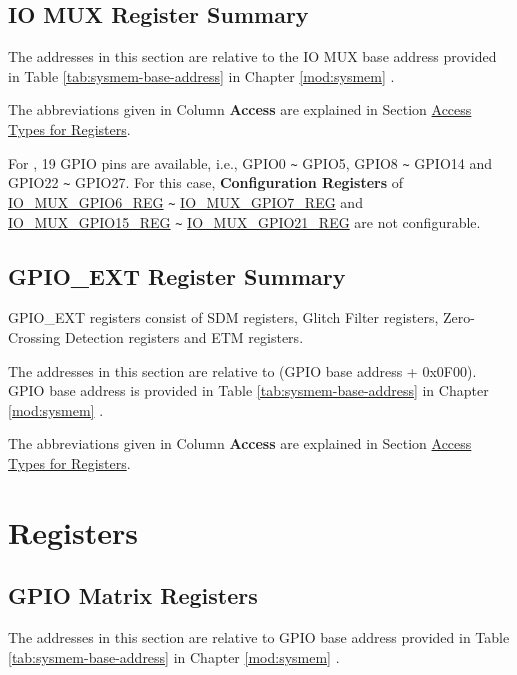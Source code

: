 \documentclass[main\_\_EN.tex]{subfiles}
\begin{document}
\label{section:4.12}



\subsection{IO MUX Register Summary}

The addresses in this section are relative to the IO MUX base address provided in Table \ref{tab:sysmem-base-address} in Chapter \ref{mod:sysmem} \textit{}.

The abbreviations given in Column \textbf{Access} are explained in Section \hyperref[glossary-access-types]{Access Types for Registers}.

For \chipname{}, 19 GPIO pins are available, i.e., GPIO0 \verb+~+ GPIO5, GPIO8 \verb+~+ GPIO14 and GPIO22 \verb+~+ GPIO27. For this case, \textbf{Configuration Registers} of \hyperref[regdesc:IOMUXGPIONREG]{IO\_MUX\_GPIO6\_REG} \verb+~+ \hyperref[regdesc:IOMUXGPIONREG]{IO\_MUX\_GPIO7\_REG} and \hyperref[regdesc:IOMUXGPIONREG]{IO\_MUX\_GPIO15\_REG} \verb+~+ \hyperref[regdesc:IOMUXGPIONREG]{IO\_MUX\_GPIO21\_REG} are not configurable.



\subsection{GPIO\_EXT Register Summary}

GPIO\_EXT registers consist of SDM registers, Glitch Filter registers, Zero-Crossing Detection registers and ETM registers.

The addresses in this section are relative to (GPIO base address + 0x0F00). GPIO base address is provided in Table \ref{tab:sysmem-base-address} in Chapter \ref{mod:sysmem} \textit{}.

The abbreviations given in Column \textbf{Access} are explained in Section \hyperref[glossary-access-types]{Access Types for Registers}.




\clearpage
\section{Registers}

\subsection{GPIO Matrix Registers}
The addresses in this section are relative to GPIO base address provided in Table \ref{tab:sysmem-base-address} in Chapter \ref{mod:sysmem} \textit{}.

\end{document}
